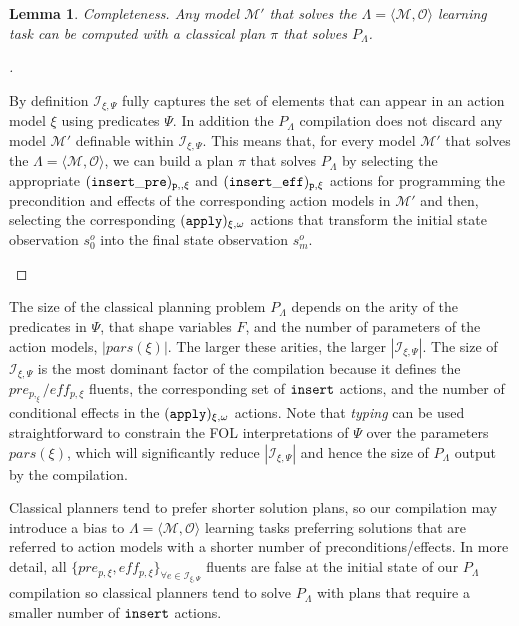 \documentclass[runningheads]{llncs}
\newcommand{\tup}[1]{{\langle #1 \rangle}}
\newtheorem{mylemma}[mytheorem]{Lemma}
\begin{document}
\begin{mylemma}
Completeness. Any model $\mathcal{M}'$ that solves the $\Lambda=\tup{\mathcal{M},{\mathcal O}}$ learning task can be computed with a classical plan $\pi$ that solves $P_{\Lambda}$.
\end{mylemma}

\begin{proof}[]
\begin{small}
By definition ${\mathcal I}_{\xi,\Psi}$ fully captures the set of elements that can appear in an action model $\xi$ using predicates $\Psi$. In addition the $P_{\Lambda}$ compilation does not discard any model $\mathcal{M}'$ definable within ${\mathcal I}_{\xi,\Psi}$. This means that, for every model $\mathcal{M}'$ that solves the $\Lambda=\tup{\mathcal{M},{\mathcal O}}$, we can build a plan $\pi$ that solves $P_{\Lambda}$ by selecting the appropriate ${\tt \small (insert\_pre)_{p,,\xi}}$ and ${\tt \small (insert\_eff)_{p,\xi}}$ actions for programming the precondition and effects of the corresponding action models in $\mathcal{M}'$ and then, selecting the corresponding ${\tt\small (apply)_{\xi,\omega}}$ actions that transform the initial state observation $s_0^o$ into the final state observation $s_m^o$.
\end{small}
\end{proof}

The size of the classical planning problem $P_{\Lambda}$ depends on the arity of the predicates in $\Psi$, that shape variables $F$, and the number of parameters of the action models, $|pars(\xi)|$. The larger these arities, the larger $|{\mathcal I}_{\xi,\Psi}|$. The size of ${\mathcal I}_{\xi,\Psi}$ is the most dominant factor of the compilation because it defines the $pre_{p,_\xi}/eff_{p,\xi}$ fluents, the corresponding set of ${\tt\small insert}$ actions, and the number of conditional effects in the ${\tt\small (apply)_{\xi,\omega}}$ actions. Note that {\em typing} can be used straightforward to constrain the FOL interpretations of $\Psi$ over the parameters $pars(\xi)$, which will significantly reduce $|{\mathcal I}_{\xi,\Psi}|$ and hence the size of $P_{\Lambda}$ output by the compilation.

Classical planners tend to prefer shorter solution plans, so our compilation may introduce a bias to $\Lambda=\tup{\mathcal{M},{\mathcal O}}$ learning tasks preferring solutions that are referred to action models with a shorter number of preconditions/effects. In more detail, all $\{pre_{p,\xi}, eff_{p,\xi}\}_{\forall e\in{\mathcal I}_{\xi,\Psi}}$ fluents are false at the initial state of our $P_{\Lambda}$ compilation so classical planners tend to solve $P_{\Lambda}$ with plans that require a smaller number of ${\tt{\small insert}}$ actions.
\end{document}

